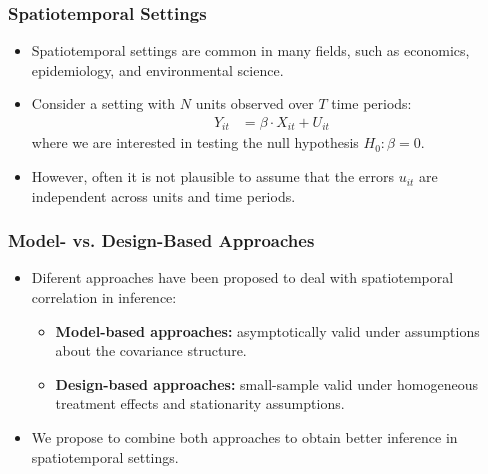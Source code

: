 \begin{frame}
    \frametitle{Spatiotemporal Settings}
    \begin{itemize}
        \item Spatiotemporal settings are common in many fields, such as economics, epidemiology, and environmental science.
        \item Consider a setting with $N$ units observed over $T$ time periods:
        \begin{align}
        Y_{it} &= \beta\cdot X_{it} + U_{it}
        \end{align}
        where we are interested in testing the null hypothesis $H_0: \beta = 0$.
        \item However, often it is not plausible to assume that the errors $u_{it}$ are independent across units and time periods.
    \end{itemize}
\end{frame}

\begin{frame}
    \frametitle{Model- vs. Design-Based Approaches}
    \begin{itemize}
        \item Diferent approaches \citep{abadie2020ECTA} have been proposed to deal with spatiotemporal correlation in inference:
        \begin{itemize}
           \item \textbf{Model-based approaches:} asymptotically valid under assumptions about the covariance structure.
           \item \textbf{Design-based approaches:} small-sample valid under homogeneous treatment effects and stationarity assumptions.
        \end{itemize}
        \item We propose to combine both approaches to obtain better inference in spatiotemporal settings.
    \end{itemize}    
\end{frame}